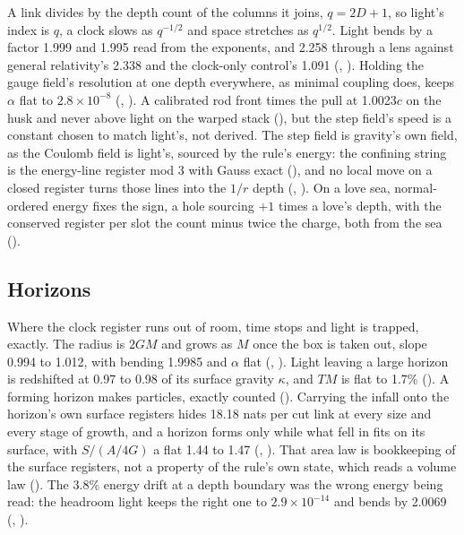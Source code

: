 A link divides by the depth count of the columns it joins, $q = 2D + 1$, so light's index is $q$, a clock slows as
$q^{-1/2}$ and space stretches as $q^{1/2}$. Light bends by a factor 1.999 and 1.995 read from the exponents, and
2.258 through a lens against general relativity's 2.338 and the clock-only control's 1.091 (,
). Holding the gauge field's resolution at one depth everywhere, as minimal coupling does, keeps
$\alpha$ flat to $2.8 \times 10^{-8}$ (, ). A calibrated rod front times the pull at
1.0023$c$ on the husk and never above light on the warped stack (), but the step field's speed is a
constant chosen to match light's, not derived. The step field is gravity's own
field, as the Coulomb field is light's, sourced by the rule's energy: the confining string is the energy-line
register mod 3 with Gauss exact (), and no local move on a closed register turns those lines into the
$1/r$ depth (, ). On a love sea, normal-ordered energy fixes the sign, a hole
sourcing $+1$ times a love's depth, with the conserved register per slot the count minus twice the charge, both from
the sea ().

\subsection{Horizons}

Where the clock register runs out of room, time stops and light is trapped, exactly. The radius is $2GM$ and grows as
$M$ once the box is taken out, slope 0.994 to 1.012, with bending 1.9985 and $\alpha$ flat (,
). Light leaving a large horizon is redshifted at 0.97 to 0.98 of its surface gravity $\kappa$, and
$T M$ is flat to 1.7\% (). A forming horizon makes particles, exactly counted ().
Carrying the infall onto the horizon's own surface registers hides 18.18 nats per cut link at every size and every
stage of growth, and a horizon forms only while what fell in fits on its surface, with $S/(A/4G)$ a flat 1.44 to 1.47
(, ). That area law is bookkeeping of the surface registers, not a property of the
rule's own state, which reads a volume law (). The 3.8\% energy drift at a
depth boundary was the wrong energy being read: the headroom light keeps the right one to $2.9 \times 10^{-14}$ and
bends by 2.0069 (, ).

